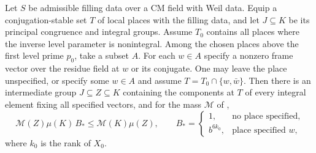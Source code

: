 \begin{lemma}
\label{lem:b-fixed-one-place}
\emitthmsource
Let $S$ be admissible filling data over a CM field with Weil data.
Equip a conjugation-stable set $T$ of local places with the filling data, and let $J\subseteq K$ be its principal congruence and integral groups.
Assume $T_0$ contains all places where the inverse level parameter is nonintegral.
Among the chosen places above the first level prime $p_0$, take a subset $A$.
For each $w\in A$ specify a nonzero frame vector over the residue field at $w$ or its conjugate.
One may leave the place unspecified, or specify some $w\in A$ and assume $T=T_0\cap\{w,\bar w\}$.
Then there is an intermediate group $J\subseteq Z\subseteq K$
containing the components at $T$ of every integral element fixing all specified vectors,
and for the mass $\mathcal M$ of ,
\[
  \mathcal M(Z)\mu(K)\,B_*
     \le \mathcal M(K)\mu(Z),
 \qquad B_*=
 \begin{cases}
  1,&\text{no place specified},\\
  b^{6k_0},&\text{place specified } w,
 \end{cases}
\]
where $k_0$ is the rank of $X_0$.
\end{lemma}
